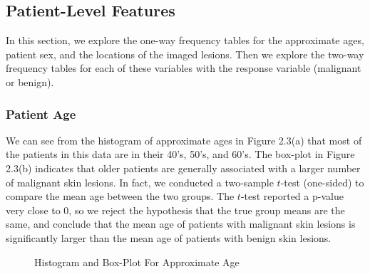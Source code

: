 \documentclass [MAS] {uclathes}
\begin{document}
\subsection{Patient-Level Features}

In this section, we explore the one-way frequency tables for the approximate ages, patient sex, and the locations of the imaged lesions. Then we explore the two-way frequency tables for each of these variables with the response variable (malignant or benign).

\subsubsection*{Patient Age}

We can see from the histogram of approximate ages in Figure 2.3(a) that most of the patients in this data are in their 40's, 50's, and 60's. The box-plot in Figure 2.3(b) indicates that older patients are generally associated with a larger number of malignant skin lesions. In fact, we conducted a two-sample $t$-test (one-sided) to compare the mean age between the two groups. The $t$-test reported a p-value very close to 0, so we reject the hypothesis that the true group means are the same, and conclude that the mean age of patients with malignant skin lesions is significantly larger than the mean age of patients with benign skin lesions.

\begin{figure}[hbt!]
\hspace*{\fill}
\centering
{}\hspace{0.5em}
\hspace*{\fill}
\label{fig:age_eda}
\vspace{0cm}
\caption{Histogram and Box-Plot For Approximate Age}
\end{figure}
\end{document}
